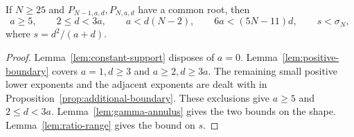 \begin{lemma}
\label{lem:support-reduction}
If \(N\ge25\) and \(P_{N-1,a,d},P_{N,a,d}\) have a common root, then
\[
 a\ge5,\qquad 2\le d<3a,\qquad
 a<d(N-2),\qquad 6a<(5N-11)d,\qquad
 s<\sigma_N,
\]
where \(s=d^2/(a+d)\).
\end{lemma}

\begin{proof}
Lemma~\ref{lem:constant-support} disposes of \(a=0\).
Lemma~\ref{lem:positive-boundary} covers \(a=1,d\ge3\) and
\(a\ge2,d\ge3a\). The remaining small positive
lower exponents and the adjacent exponents are dealt with in
Proposition~\ref{prop:additional-boundary}. These exclusions give
\(a\ge5\) and \(2\le d<3a\). Lemma~\ref{lem:gamma-annulus} gives
the two bounds on the shape. Lemma~\ref{lem:ratio-range} gives the
bound on \(s\).
\end{proof}
